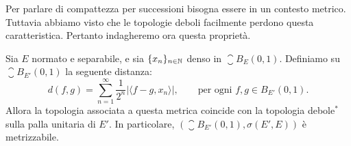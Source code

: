 Per parlare di compattezza per successioni bisogna essere in un contesto metrico. Tuttavia abbiamo visto che le topologie deboli facilmente perdono questa caratteristica. Pertanto indagheremo ora questa proprietà.

\begin{theorem}
\label{th:weaktop_fourteen}
	Sia $E$ normato e separabile, e sia $\{x_n\}_{n \in \mathbb{N}}$ denso in $\closure B_E(0,1)$.
	Definiamo su $\closure B_{E'}(0,1)$ la seguente distanza:
	\begin{equation*}
		d(f,g) = \sum_{n=1}^\infty \frac1{2^n} |\langle f-g, x_n\rangle|, \qquad \text{per ogni $f,g \in B_{E'}(0,1)$}.
	\end{equation*}
	Allora la topologia associata a questa metrica coincide con la topologia debole$^*$ sulla palla unitaria di $E'$.
	In particolare, $(\closure B_{E'}(0,1), \sigma(E',E))$ è metrizzabile.
\end{theorem}
